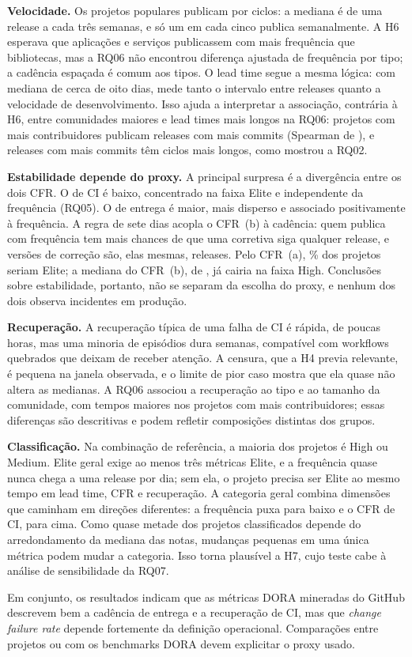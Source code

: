 \textbf{Velocidade.} Os projetos populares publicam por ciclos: a mediana é de uma
release a cada três semanas, e só um em cada cinco publica semanalmente. A H6 esperava
que aplicações e serviços publicassem com mais frequência que bibliotecas, mas a RQ06 não
encontrou diferença ajustada de frequência por tipo; a cadência espaçada é comum aos tipos.
O lead time segue a mesma lógica: com mediana de cerca de oito dias, mede tanto o
intervalo entre releases quanto a velocidade de desenvolvimento. Isso ajuda a interpretar
a associação, contrária à H6, entre comunidades maiores e lead times mais longos na RQ06:
projetos com mais contribuidores publicam releases com mais commits (Spearman de
\labALeadRhoContribuidores), e releases com mais commits têm ciclos mais longos, como
mostrou a RQ02.

\textbf{Estabilidade depende do proxy.} A principal surpresa é a divergência entre os dois
CFR. O de CI é baixo, concentrado na faixa Elite e independente da frequência (RQ05). O de
entrega é maior, mais disperso e associado positivamente à frequência. A regra de sete dias
acopla o CFR~(b) à cadência: quem publica com frequência tem mais chances de que uma
corretiva siga qualquer release, e versões de correção são, elas mesmas, releases. Pelo
CFR~(a), \labACOneCfrElitePct\% dos projetos seriam Elite; a mediana do CFR~(b), de
\labACfrBMediana, já cairia na faixa High. Conclusões sobre estabilidade, portanto, não se
separam da escolha do proxy, e nenhum dos dois observa incidentes em produção.

\textbf{Recuperação.} A recuperação típica de uma falha de CI é rápida, de poucas horas,
mas uma minoria de episódios dura semanas, compatível com workflows quebrados que deixam
de receber atenção. A censura, que a H4 previa relevante, é pequena na janela observada,
e o limite de pior caso mostra que ela quase não altera as medianas. A RQ06 associou a
recuperação ao tipo e ao tamanho da comunidade, com tempos maiores nos projetos com mais
contribuidores; essas diferenças são descritivas e podem refletir composições distintas
dos grupos.

\textbf{Classificação.} Na combinação de referência, a maioria dos projetos é High ou
Medium. Elite geral exige ao menos três métricas Elite, e a frequência quase nunca chega a
uma release por dia; sem ela, o projeto precisa ser Elite ao mesmo tempo em lead time, CFR
e recuperação. A categoria geral combina dimensões que caminham em direções diferentes: a
frequência puxa para baixo e o CFR de CI, para cima. Como quase metade dos projetos classificados depende
do arredondamento da mediana das notas, mudanças pequenas em uma única métrica podem
mudar a categoria. Isso torna plausível a H7, cujo teste cabe à análise de sensibilidade
da RQ07.

Em conjunto, os resultados indicam que as métricas DORA mineradas do GitHub descrevem
bem a cadência de entrega e a recuperação de CI, mas que \textit{change failure rate}
depende fortemente da definição operacional. Comparações entre projetos ou com os
benchmarks DORA devem explicitar o proxy usado.
